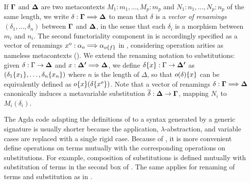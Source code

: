 \begin{notation}
\label{not:vector-renamings}If $\boldsymbol{\Gamma}$ and $\boldsymbol{\Delta}$
are two metacontexts $M_{1}:m_{1},\dots,M_{p}:m_{p}$ and $N_{1}:n_{1},\dots,N_{p}:n_{p}$
of the same length, we write $\delta:\boldsymbol{\Gamma}\Longrightarrow\boldsymbol{\Delta}$
to mean that $\delta$ is a \emph{vector of renamings} $(\delta_{1},\dots,\delta_{n})$
between $\boldsymbol{\Gamma}$ and $\boldsymbol{\Delta}$, in the
sense that each $\delta_{i}$ is a morphism between $m_{i}$ and \textbf{$n_{i}$}.
The second functoriality component in  is
accordingly specified as a vector of renamings $x^{o}:\alpha_{o}\Longrightarrow\alpha_{o\{f\}}$
in , considering operation arities as nameless
metacontexts (). We extend the renaming notation
to substitutions: given $\delta:\Gamma\rightarrow\boldsymbol{\Delta}$
and $x:\boldsymbol{\Delta'}\Longrightarrow\boldsymbol{\Delta}$,
we define $\delta\{x\}:\Gamma\rightarrow\boldsymbol{\Delta'}$
as $(\delta_{1}\{x_{1}\},\dots,\delta_{n}\{x_{n}\})$
where $n$ is the length of $\Delta$, so that $o(\delta)\{x\}$
can be equivalently defined as $o\{x\}(\delta\{x^{o}\})$.
Note that a vector of renamings $\delta:\boldsymbol{\Gamma}\Longrightarrow\boldsymbol{\Delta}$
canonically induces a metavariable substitution $\overline{\delta}:\boldsymbol{\Delta}\rightarrow\boldsymbol{\Gamma}$,
mapping $N_{i}$ to $M_{i}(\delta_{i})$.
\end{notation}
The Agda code adapting the definitions of 
to a syntax generated by a generic signature is usually shorter because
the application, $\lambda$-abstraction, and variable cases are replaced
with a single rigid case. Because of , it is
more convenient define operations on terms mutually with the corresponding
operations on substitutions. For example, composition of substitutions
is defined mutually with substitution of terms in the second box of
. The same applies for renaming of terms and substitution
as in . 

